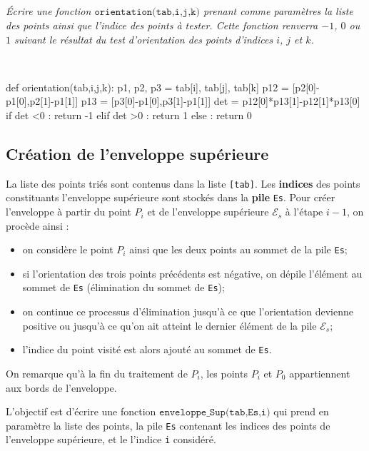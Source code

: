 \documentclass[10pt,fleqn]{article} %
\begin{document}
\subparagraph{}
\textit{Écrire une fonction $\texttt{orientation(tab,i,j,k)}$ prenant comme paramètres la liste des points ainsi que l'indice des points à tester. Cette fonction renverra $-1$, $0$ ou $1$ suivant le résultat du test d'orientation des points d'indices $i$, $j$ et $k$. }
\ifprof
\begin{corrige}~\\
\begin{py}
\begin{python}
def orientation(tab,i,j,k):
    p1, p2, p3 = tab[i], tab[j], tab[k]
    p12 = [p2[0]-p1[0],p2[1]-p1[1]]
    p13 = [p3[0]-p1[0],p3[1]-p1[1]]
    det = p12[0]*p13[1]-p12[1]*p13[0]
    if det <0 :
        return -1
    elif det >0 :
        return 1
    else :
        return 0
\end{python}
\end{py}
\end{corrige}
\else
\fi

\subsection{Création de l'enveloppe supérieure}
\ifprof
\else
La liste des points triés sont contenus dans la liste \texttt{[tab]}. Les \textbf{indices} des points constituants l'enveloppe supérieure sont stockés dans la  \textbf{pile} \texttt{Es}. Pour créer l'enveloppe à partir du point $P_i$ et de l'enveloppe supérieure $\mathcal{E}_s$ à l'étape $i-1$, on procède ainsi : 
\begin{itemize}
\item on considère le point $P_i$ ainsi que les deux points au sommet de la pile \texttt{Es};
\item si l'orientation des trois points précédents est négative, on dépile l'élément au sommet de \texttt{Es} (élimination du sommet de \texttt{Es});
\item on continue ce processus d'élimination jusqu'à ce que l'orientation devienne positive ou jusqu'à ce qu'on ait atteint le dernier élément de la pile $\mathcal{E}_s$;
\item l'indice du point visité est alors ajouté au sommet de \texttt{Es}.
\end{itemize}

On remarque qu'à la fin du traitement de $P_i$, les points $P_i$ et $P_0$ appartiennent aux bords de l'enveloppe.

\begin{obj}
L'objectif est d'écrire une fonction $\texttt{enveloppe\_Sup(tab,Es,i)}$ qui prend en paramètre la liste des points, la pile \texttt{Es} contenant les indices des points de l'enveloppe supérieure, et le l'indice \texttt{i} considéré.
\end{obj}
\fi
\end{document}
